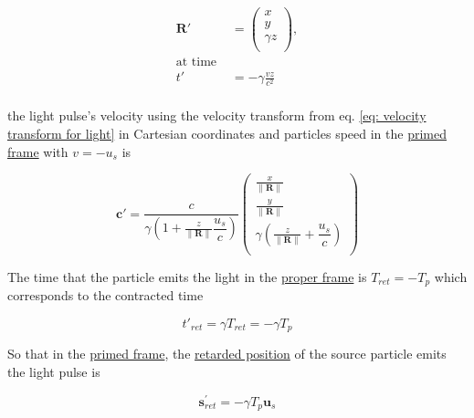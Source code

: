\begin{equation}
	\label{eq: displacement transform}
	\begin{aligned}
		\mathbf{R}{'} & =
		\begin{pmatrix}
			x          \\
			y          \\
			{\gamma} z \\
		\end{pmatrix},                            \\
		\text{at time \ \ \ }                     \\
		t{'}          & = - {\gamma} \frac{vz}{c^2} \\
	\end{aligned}
\end{equation}

the light pulse's velocity using the velocity transform from eq.
\eqref{eq: velocity transform for light} in Cartesian coordinates and particles speed in the \hyperlink{def-Primed-Frame}{primed frame} with $v=-u_s$ is

\begin{equation}
	\label{eq: light pulse velocity transform}
	\mathbf{c}{'} = \dfrac{c}{{\gamma}\left(1 + \frac{z}{\|\mathbf{R}\|} \dfrac{u_s}{c} \right)}
	\begin{pmatrix}
		\frac{x}{\|\mathbf{R}\|}                                          \\
		\frac{y}{\|\mathbf{R}\|}                                          \\
		{\gamma} \left( \frac{z}{\|\mathbf{R}\|} + \dfrac{u_s}{c} \right) \\
	\end{pmatrix}
\end{equation}


The time that the particle emits the light in the \hyperlink{def-proper-frame}{proper frame} is ${T}_{ret}= - {T}_{p}$ which corresponds to the contracted time

\begin{equation}
	t{'}_{ret}= {\gamma} {T}_{ret} = - {\gamma} {T}_{p}
\end{equation}

So that in the \hyperlink{def-Primed-Frame}{primed frame}, the \hyperlink{def-retarded-position}{retarded position} of the source particle emits the light pulse is

\begin{equation}
	\mathbf{s}_{ret}^{'} = - {\gamma} {T}_{p} \mathbf{u}_s
\end{equation}

